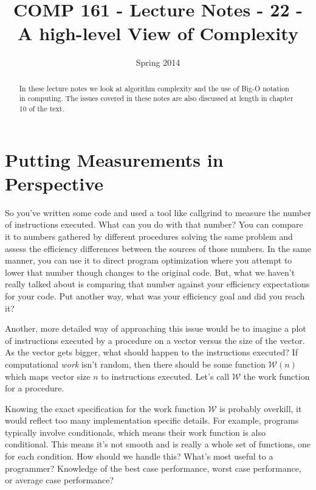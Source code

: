 \documentclass[]{tufte-handout}
\title{COMP 161 - Lecture Notes - 22 - A high-level View of Complexity}
\date{Spring 2014}
\begin{document}
 
\maketitle

\begin{abstract}
In these lecture notes we look at algorithm complexity and the use of Big-O notation in computing. The issues covered in these notes are also discussed at length in chapter 10 of the text.
\end{abstract}

\section{Putting Measurements in Perspective}

So you've written some code and used a tool like callgrind to measure the number of instructions executed. What can you do with that number? You can compare it to numbers gathered by different procedures solving the same problem and assess the efficiency differences between the sources of those numbers. In the same manner, you can use it to direct program optimization where you attempt to lower that number though changes to the original code. But, what we haven't really talked about is comparing that number against your efficiency expectations for your code. Put another way, what was your efficiency goal and did you reach it? 

Another, more detailed way of approaching this issue would be to imagine a plot of instructions executed by a procedure on a vector versus the size of the vector. As the vector gets bigger, what should happen to the instructions executed? If computational \textit{work} isn't random, then there should be some function $\mathcal{W}(n)$ which maps vector size $n$ to instructions executed. Let's call $\mathcal{W}$ the work function for a procedure.

Knowing the exact specification for the work function $\mathcal{W}$ is probably overkill, it would reflect too many implementation specific details. For example, programs typically involve conditionals, which means their work function is also conditional. This means it's not smooth and is really a whole set of functions, one for each condition. How should we handle this? What's most useful to a programmer? Knowledge of the best case performance, worst case performance, or average case performance?  
\end{document}

